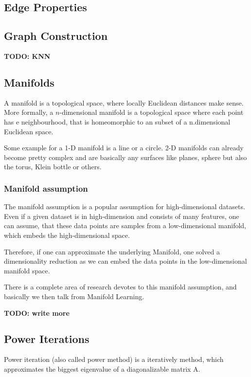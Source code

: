 \subsection{Edge Properties}

\subsection{Graph Construction}
\textbf{TODO: KNN}


\subsection{Manifolds}
A manifold is a topological space, where locally Euclidean distances make sense.
More formally, a $n$-dimensional manifold is a topological space where
each point has e neighbourhood, that is homeomorphic to an subset of a n.dimensional
Euclidean space.

Some example for a 1-D manifold is a line or a circle. 2-D manifolds can already become 
pretty complex and are basically any surfaces like planes, sphere but also the torus,
Klein bottle or others.

\subsubsection{Manifold assumption}
The manifold assumption is a popular assumption for high-dimensional datasets.
Even if a given dataset is in high-dimension and consists of many features, one can assume,
that these data points are samples from a low-dimensional manifold, 
which embeds the high-dimensional space.

Therefore, if one can approximate the underlying Manifold, one solved a dimensionality reduction
as we can embed the data points in the low-dimensional manifold space.

There is a complete area of research devotes to this manifold assumption, and basically
we then talk from Manifold Learning. 

\textbf{TODO: write more} \cite{ManifoldLearning}


\subsection{Power Iterations}

Power iteration (also called power method) is a iteratively method, 
which approximates the biggest eigenvalue of a diagonalizable matrix A.

